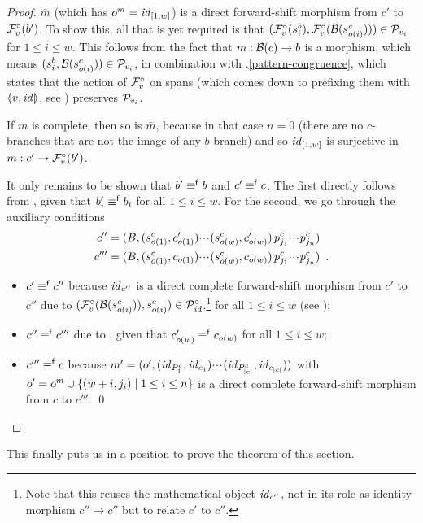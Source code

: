 \begin{proof}
\smallskip
$\bar m$ (which has $o^{\bar m}=\mathit{id}_{[1,w]}$) is a direct forward-shift morphism from $c'$ to $\mathcal{F}^\circ_{v}(b')$. To show this, all that is yet required is that $(\mathcal{F}^\circ_{v}(s^b_i),\mathcal{F}^\circ_{v}(\mathcal{B}(s^c_{o(i)}))) \in \mathcal{P}_{v_i}$ for $1\leq i\leq w$. This follows from the fact that $m:\mathcal{B}(c) \rightarrow b$ is a morphism, which means $(s^b_i,\mathcal{B}(s^c_{o(i)}))\in \mathcal{P}_{v_i}$, in combination with .\ref{pattern-congruence}, which states that the action of $\mathcal{F}^\circ_{v}$ on spans (which comes down to prefixing them with $\spanof{v}{\id}$, see ) preserves $\mathcal{P}_{v_i}$.

\smallskip
If $m$ is complete, then so is $\bar m$, because in that case $n=0$ (there are no $c$-branches that are not the image of any $b$-branch) and so $\mathit{id}_{[1,w]}$ is surjective in $\bar m:c' \rightarrow \mathcal{F}^\circ_{v}(b')$.

\smallskip
It only remains to be shown that $b'\equiv^{\mathsf f} b$ and $c'\equiv^{\mathsf f} c$. The first directly follows from , given that $b'_i\equiv^{\mathsf f} b_i$ for all $1\leq i\leq w$. For the second, we go through the auxiliary conditions
\begin{align*}
c''=\;&(B,(s^c_{o(1)},c'_{o(1)}){\cdotp\mkern-2mu\cdotp\mkern-2mu\cdotp\mkern1mu} (s^c_{o(w)},c'_{o(w)})\,p^c_{j_1}{\cdotp\mkern-2mu\cdotp\mkern-2mu\cdotp\mkern1mu} p^c_{j_n}) \\
c'''=\;&(B,(s^c_{o(1)},c_{o(1)}){\cdotp\mkern-2mu\cdotp\mkern-2mu\cdotp\mkern1mu} (s^c_{o(w)},c_{o(w)})\,p^c_{j_1}{\cdotp\mkern-2mu\cdotp\mkern-2mu\cdotp\mkern1mu} p^c_{j_n}) \enspace.
\end{align*}
\begin{itemize}
\item $c'\equiv^{\mathsf f} c''$ because $\mathit{id}_{c''}$ is a direct complete forward-shift morphism from $c'$ to $c''$ due to $(\mathcal{F}^\circ_{v}(\mathcal{B}(s^c_{o(i)})),s^c_{o(i)})\in \mathcal{P}^\circ_{\mathit{id}}$.\footnote{Note that this reuses the mathematical object $\mathit{id}_{c''}$, not in its role as identity morphism $c''\to c''$ but to relate $c'$ to $c''$.}  for all $1\leq i\leq w$ (see );

\item $c''\equiv^{\mathsf f} c'''$ due to , given that $c'_{o(w)}\equiv^{\mathsf f} c_{o(w)}$ for all $1\leq i\leq w$; 

\item $c'''\equiv^{\mathsf f} c$ because $m'=(o',(\mathit{id}_{P^c_1},\mathit{id}_{c_1}){\cdotp\mkern-2mu\cdotp\mkern-2mu\cdotp\mkern1mu} (\mathit{id}_{P^c_{|c|}},\mathit{id}_{c_{|c|}}))$ with $o'=o^m\cup\{{(w+i,j_i) \mid 1\leq i\leq n}\}$ is a direct complete forward-shift morphism from $c$ to $c'''$.
\qed
\end{itemize}
\end{proof}
%
This finally puts us in a position to prove the theorem of this section.

